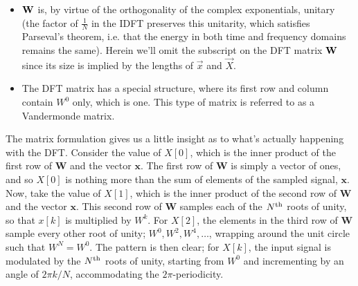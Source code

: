 %
\begin{itemize}
\item $\mathbf{W}$ is, by virtue of the orthogonality of
  the complex exponentials, unitary (the factor of $\frac{1}{N}$ in the
  IDFT preserves this unitarity, which satisfies Parseval's theorem, i.e. that
  the energy in both time and frequency domains remains the same). Herein we'll omit the
  subscript on the DFT matrix $\mathbf{W}$ since its size is implied by the lengths of $\vec{x}$
  and $\vec{X}$.
\item The DFT matrix has a special structure, where its first row and column
  contain $W^0$ only, which is one. This type of matrix is referred to as
  a Vandermonde matrix.
  
\end{itemize}
%
The matrix formulation gives us a little insight as to what's actually happening with
the DFT. Consider the value of $X[0]$, which is the inner product of the first row of
$\mathbf{W}$ and the vector $\mathbf{x}$. The first row of $\mathbf{W}$ is simply
a vector of ones, and so $X[0]$ is nothing more than the sum of elements of the
sampled signal, $\mathbf{x}$. Now, take the value of $X[1]$, which is the inner
product of the second row of $\mathbf{W}$ and the vector $\mathbf{x}$. This second
row of $\mathbf{W}$ samples each of the $N^\mathrm{th}\mkern1mu$ roots of unity, so that $x[k]$ is
multiplied by $W^k$. For $X[2]$, the elements in the third row of $\mathbf{W}$
sample every other root of unity; $W^0, W^2, W^4, \hdots$, wrapping around
the unit circle such that $W^N = W^0$. The pattern is then clear; for $X[k]$,
the input signal is modulated by the $N^\mathrm{th}\mkern1mu$ roots of unity, starting from $W^0$
and incrementing by an angle of $2\pi k/N$, accommodating the $2\pi$-periodicity.\\

